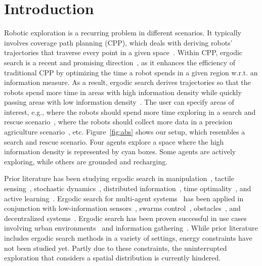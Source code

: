 \documentclass[letterpaper,10pt,conference,twoside]{IEEEtran}
\theoremstyle{definition}
\begin{document}
\section{Introduction}
\noindent
Robotic exploration is a recurring problem in different scenarios. It typically involves coverage path planning (CPP), which deals with deriving robots' trajectories that traverse every point in a given space~\cite{choset2001coverage,galceran2013survey,cabreira2019survey}. Within CPP, ergodic search is a recent and promising direction~\cite{abraham2021ergodic,miller2016ergodic,dressel2018optimality,torre2016ergodic,shetty2022ergodic,prabhakar2020ergodic,coffin2022multi,lerch2023safety,abraham2018decentralized,patel2021multi,dong2023time,abraham2017ergodic,rao2023multi,ayvali2017ergodic}, as it enhances the efficiency of traditional CPP by optimizing the time a robot spends in a given region w.r.t. an information measure. As a result, ergodic search derives trajectories so that the robots spend more time in areas with high information density while quickly passing areas with low information density~\cite{mathew2011metrics,%
patel2021multi}. The user can specify areas of interest, e.g., where the robots should spend more time exploring in a search and rescue scenario~\cite{dong2023time}, where the robots should collect more data in a precision agriculture scenario~\cite{rao2023multi}, etc.
Figure~\ref{fig:abs}  shows our setup, which resembles a search and rescue scenario. Four agents explore a space where the high information density is represented by cyan boxes. Some agents are actively exploring, while others are grounded and recharging.

Prior literature has been studying ergodic search in manipulation~\cite{shetty2022ergodic}, tactile sensing~\cite{abraham2017ergodic}, stochastic dynamics~\cite{ayvali2017ergodic,torre2016ergodic}, distributed information~\cite{miller2016ergodic}, time optimality~\cite{dong2023time}, and active learning~\cite{abraham2021ergodic}. Ergodic search for multi-agent systems~\cite{prabhakar2020ergodic,coffin2022multi} has been applied in conjunction with low-information sensors~\cite{coffin2022multi,lerch2023safety,abraham2018decentralized}, swarms control~\cite{prabhakar2020ergodic}, obstacles~\cite{lerch2023safety}, and decentralized systems~\cite{abraham2018decentralized}. Ergodic search has been proven successful in use cases involving urban environments~\cite{patel2021multi} and information gathering~\cite{dressel2018optimality}.
While prior literature includes ergodic search methods in a variety of settings, energy constraints have not been studied yet. 
Partly due to these constraints, the uninterrupted exploration %
that %
considers a spatial distribution is currently hindered. 
\end{document}
